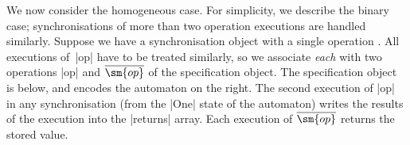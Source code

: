 
We now consider the homogeneous case.  For simplicity, we describe the binary
case; synchronisations of more than two operation executions are handled
similarly.  Suppose we have a synchronisation object with a single operation
.  All executions of~|op| have to be treated similarly,
so we associate \emph{each} with two operations |op| and $\overline{\sm{op}}$
of the specification object.  The specification object is below, and encodes
the automaton on the right.
%
The second execution of |op| in any synchronisation (from the |One| state of the
automaton) writes the results of the execution into the |returns| array.
Each execution of $\overline{\sm{op}}$ returns the stored value.

